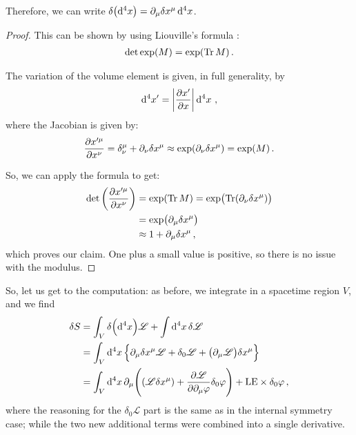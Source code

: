 \documentclass[main.tex]{subfiles}
\begin{document}
Therefore, we can write \(\delta \qty(\dd[4]{x}) = \partial_{\mu } \delta x^{\mu } \dd[4]{x}\).

\begin{proof}
This can be shown by using Liouville's formula \cite[eq. 4.9]{winitzkiLinearAlgebraExterior2010}:
%
\begin{align}
\det \exp(M) = \exp(\Tr M)
\,.
\end{align}

The variation of the volume element is given, in full generality, by 
%
\begin{align}
\dd[4]{x'} = \abs{ \pdv{x'}{x}} \dd[4]{x}
\,,
\end{align}
%
where the Jacobian is given by:
%
\begin{align}
\pdv{x^{\prime \mu }}{x^{\nu }} = \delta^{\mu }_{\nu } + \partial_{\nu } \delta x^{\mu } \approx \exp( \partial_{\nu } \delta x^{\mu }) = \exp(M)
\,.
\end{align}

So, we can apply the formula to get: 
%
\begin{subequations}
\begin{align}
\det \qty(\pdv{x^{\prime \mu }}{x^{\nu }}) &= \exp(\Tr M)
= \exp(\Tr(\partial_{\nu } \delta x^{\mu }))   \\
&= \exp( \partial_{\mu } \delta x^{\mu })  \\
&\approx 1 + \partial_{\mu } \delta x^{\mu }
\,,
\end{align}
\end{subequations}
%
which proves our claim. One plus a small value is positive, so there is no issue with the modulus. 
\end{proof}

So, let us get to the computation: as before, we integrate in a spacetime region \(V\), and we find 
%
\begin{subequations}
\begin{align}
\delta S &= \int_{V} \delta \qty(\dd[4]{x}) \mathscr{L} + \int \dd[4]{x} \delta \mathscr{L}  \\
&= \int_V \dd[4]{x} \qty{ \partial_{\mu } \delta x^{\mu } \mathscr{L} + 
\delta_{0} \mathscr{L} + \qty(\partial_{\mu } \mathscr{L}) \delta x^{\mu}
}  \\
&= \int_V \dd[4]{x}  \partial_{\mu } \qty(\qty(\mathscr{L} \delta x^{\mu }) + \pdv{\mathscr{L}}{\partial_{\mu } \varphi } \delta_0  \varphi )
+ \text{LE} \times \delta_0 \varphi  
\,,
\end{align}
\end{subequations}
%
where the reasoning for the \(\delta_0 \mathscr{L}\) part is the same as in the internal symmetry case; while the two new additional terms were combined into a single derivative. 
\end{document}
